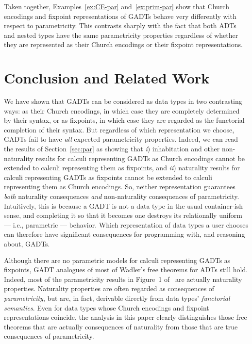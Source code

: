 \documentclass[submission,copyright,creativecommons]{eptcs}
\begin{document}
Taken together, Examples~\ref{ex:CE-par} and~\ref{ex:prim-par} show
that Church encodings and fixpoint representations of GADTs behave
very differently with respect to parametricity.  This contrasts
sharply with the fact that both ADTs and nested types have the same
parametricity properties regardless of whether they are represented as
their Church encodings or their fixpoint representations.

\section{Conclusion and Related Work}

We have shown that GADTs can be considered as data types in two
contrasting ways: as their Church encodings, in which case they are
completely determined by their syntax, or as fixpoints, in which case
they are regarded as the functorial completion of their syntax. But
regardless of which representation we choose, GADTs fail to have {\em
  all} expected parametricity properties.  Indeed, we can read the
results of Section~\ref{sec:par} as showing that {\em i}) inhabitation
and other non-naturality results for calculi representing GADTs as
Church encodings cannot be extended to calculi representing them as
fixpoints, and {\em ii}) naturality results for calculi representing
GADTs as fixpoints cannot be extended to calculi representing them as
Church encodings. So, neither representation guarantees {\em both}
naturality consequences {\em and} non-naturality consequences of
parametricity. Intuitively, this is because a GADT is not a data type
in the usual container-ish sense, and completing it so that it becomes
one destroys its relationally uniform --- i.e., parametric ---
behavior.  Which representation of data types a user chooses can
therefore have significant consequences for programming with, and
reasoning about, GADTs.

Although there are no parametric models for calculi representing GADTs
as fixpoints, GADT analogues of most of Wadler's free theorems for
ADTs still hold.
Indeed, most of the parametricity results in Figure~1 of~\cite{wad89}
are actually naturality properties.
Naturality properties are often regarded as consequences of {\em
  parametricity}, but are, in fact, derivable directly from data
types' {\em functorial semantics}. Even for data types whose Church
encodings and fixpoint representations coincide, the analysis in this
paper clearly distinguishes those free theorems that are actually
consequences of naturality from those that are true consequences of
parametricity.
\end{document}

